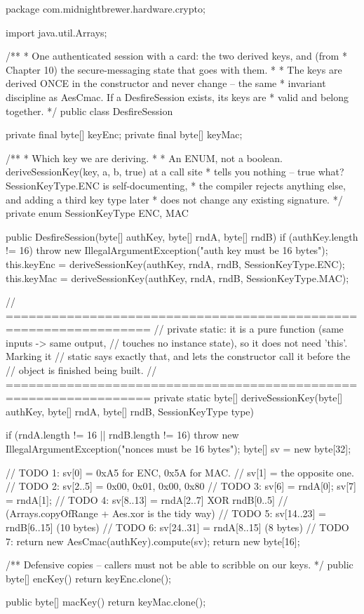 \begin{jcode}
package com.midnightbrewer.hardware.crypto;

import java.util.Arrays;

/**
 * One authenticated session with a card: the two derived keys, and (from
 * Chapter 10) the secure-messaging state that goes with them.
 *
 * The keys are derived ONCE in the constructor and never change -- the same
 * invariant discipline as AesCmac. If a DesfireSession exists, its keys are
 * valid and belong together.
 */
public class DesfireSession {

    private final byte[] keyEnc;
    private final byte[] keyMac;

    /**
     * Which key we are deriving.
     *
     * An ENUM, not a boolean. deriveSessionKey(key, a, b, true) at a call site
     * tells you nothing -- true what? SessionKeyType.ENC is self-documenting,
     * the compiler rejects anything else, and adding a third key type later
     * does not change any existing signature.
     */
    private enum SessionKeyType { ENC, MAC }

    public DesfireSession(byte[] authKey, byte[] rndA, byte[] rndB) {
        if (authKey.length != 16) {
            throw new IllegalArgumentException("auth key must be 16 bytes");
        }
        this.keyEnc = deriveSessionKey(authKey, rndA, rndB, SessionKeyType.ENC);
        this.keyMac = deriveSessionKey(authKey, rndA, rndB, SessionKeyType.MAC);
    }

    // =================================================================
    // private static: it is a pure function (same inputs -> same output,
    // touches no instance state), so it does not need 'this'. Marking it
    // static says exactly that, and lets the constructor call it before the
    // object is finished being built.
    // =================================================================
    private static byte[] deriveSessionKey(byte[] authKey, byte[] rndA,
                                           byte[] rndB, SessionKeyType type) {
        if (rndA.length != 16 || rndB.length != 16) {
            throw new IllegalArgumentException("nonces must be 16 bytes");
        }
        byte[] sv = new byte[32];

        // TODO 1: sv[0] = 0xA5 for ENC, 0x5A for MAC.
        //         sv[1] = the opposite one.
        // TODO 2: sv[2..5] = 0x00, 0x01, 0x00, 0x80
        // TODO 3: sv[6] = rndA[0];  sv[7] = rndA[1];
        // TODO 4: sv[8..13] = rndA[2..7] XOR rndB[0..5]
        //         (Arrays.copyOfRange + Aes.xor is the tidy way)
        // TODO 5: sv[14..23] = rndB[6..15]     (10 bytes)
        // TODO 6: sv[24..31] = rndA[8..15]     (8 bytes)
        // TODO 7: return new AesCmac(authKey).compute(sv);
        return new byte[16];
    }

    /** Defensive copies -- callers must not be able to scribble on our keys. */
    public byte[] encKey() { return keyEnc.clone(); }

    public byte[] macKey() { return keyMac.clone(); }
}
\end{jcode}

